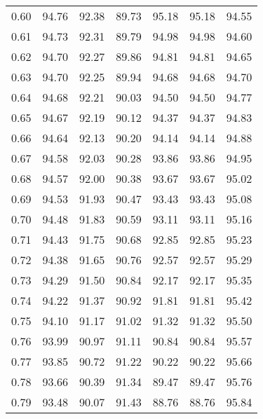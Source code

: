 \begin{tabular}{|c|c|c|c|c|c|c|}
      0.60 &     94.76 &     92.38 &      89.73 &   95.18 &      95.18 &         94.55 \\
      0.61 &     94.73 &     92.31 &      89.79 &   94.98 &      94.98 &         94.60 \\
      0.62 &     94.70 &     92.27 &      89.86 &   94.81 &      94.81 &         94.65 \\
      0.63 &     94.70 &     92.25 &      89.94 &   94.68 &      94.68 &         94.70 \\
      0.64 &     94.68 &     92.21 &      90.03 &   94.50 &      94.50 &         94.77 \\
      0.65 &     94.67 &     92.19 &      90.12 &   94.37 &      94.37 &         94.83 \\
      0.66 &     94.64 &     92.13 &      90.20 &   94.14 &      94.14 &         94.88 \\
      0.67 &     94.58 &     92.03 &      90.28 &   93.86 &      93.86 &         94.95 \\
      0.68 &     94.57 &     92.00 &      90.38 &   93.67 &      93.67 &         95.02 \\
      0.69 &     94.53 &     91.93 &      90.47 &   93.43 &      93.43 &         95.08 \\
      0.70 &     94.48 &     91.83 &      90.59 &   93.11 &      93.11 &         95.16 \\
      0.71 &     94.43 &     91.75 &      90.68 &   92.85 &      92.85 &         95.23 \\
      0.72 &     94.38 &     91.65 &      90.76 &   92.57 &      92.57 &         95.29 \\
      0.73 &     94.29 &     91.50 &      90.84 &   92.17 &      92.17 &         95.35 \\
      0.74 &     94.22 &     91.37 &      90.92 &   91.81 &      91.81 &         95.42 \\
      0.75 &     94.10 &     91.17 &      91.02 &   91.32 &      91.32 &         95.50 \\
      0.76 &     93.99 &     90.97 &      91.11 &   90.84 &      90.84 &         95.57 \\
      0.77 &     93.85 &     90.72 &      91.22 &   90.22 &      90.22 &         95.66 \\
      0.78 &     93.66 &     90.39 &      91.34 &   89.47 &      89.47 &         95.76 \\
      0.79 &     93.48 &     90.07 &      91.43 &   88.76 &      88.76 &         95.84 \\

\end{tabular}
